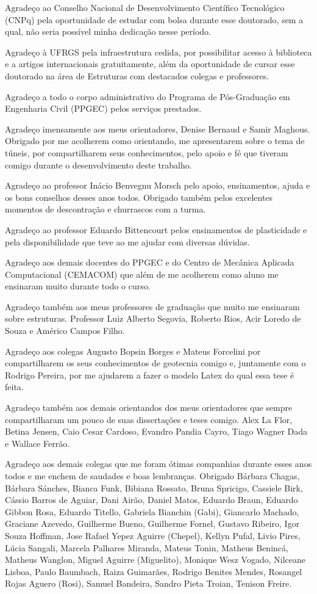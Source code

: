 Agradeço ao Conselho Nacional de Desenvolvimento Científico Tecnológico (CNPq) pela oportunidade de estudar com bolsa durante esse doutorado, sem a qual, não seria possível minha dedicação nesse período.

Agradeço à UFRGS pela infraestrutura cedida, por possibilitar acesso à biblioteca e a artigos internacionais gratuitamente, além da oportunidade de cursar esse doutorado na área de Estruturas com destacados colegas e professores.

Agradeço a todo o corpo administrativo do Programa de Pós-Graduação em Engenharia Civil (PPGEC) pelos serviços prestados.

Agradeço imensamente aos meus orientadores, Denise Bernaud e Samir Maghous. Obrigado por me acolherem como orientando, me apresentarem sobre o tema de túneis, por compartilharem seus conhecimentos, pelo apoio e fé que tiveram comigo durante o desenvolvimento deste trabalho.

Agradeço ao professor Inácio Benvegnu Morsch pelo apoio, ensinamentos, ajuda e os bons conselhos desses anos todos. Obrigado também pelos excelentes momentos de descontração e churrascos com a turma.

Agradeço ao professor Eduardo Bittencourt pelos ensinamentos de plasticidade e pela disponibilidade que teve ao me ajudar com diversas dúvidas.

Agradeço aos demais docentes do PPGEC e do Centro de Mecânica Aplicada Computacional (CEMACOM) que além de me acolherem como aluno me ensinaram muito durante todo o curso.

Agradeço também aos meus professores de graduação que muito me ensinaram sobre estruturas. Professor Luiz Alberto Segovia, Roberto Rios, Acir Loredo de Souza e Américo Campos Filho.

Agradeço aos colegas Augusto Bopsin Borges e Mateus Forcelini por compartilharem os seus conhecimentos de geotecnia comigo e, juntamente com o Rodrigo Pereira, por me ajudarem a fazer o modelo Latex do qual essa tese é feita.

Agradeço também aos demais orientandos dos meus orientadores que sempre compartilharam um pouco de suas dissertações e teses comigo. Alex La Flor,  Betina Jensen, Caio Cesar Cardoso, Evandro Pandia Cayro, Tiago Wagner Dada e Wallace Ferrão. 

Agradeço aos demais colegas que me foram ótimas companhias durante esses anos todos e me enchem de saudades e boas lembranças. Obrigado Bárbara Chagas, Bárbara Sánches, Bianca Funk, Bibiana Rossato, Bruna Spricigo, Cassiele Birk, Cássio Barros de Aguiar, Dani Airão, Daniel Matos, Eduardo Braun, Eduardo Gibbon Rosa, Eduardo Titello, Gabriela Bianchin (Gabi), Giancarlo Machado, Graciane Azevedo, Guilherme Bueno, Guilherme Fornel, Gustavo Ribeiro, Igor Souza Hoffman, Jose Rafael Yepez Aguirre (Chepel), Kellyn Pufal, Livio Pires, Lúcia Sangali, Marcela Palhares Miranda, Mateus Tonin, Matheus Benincá, Matheus Wanglon, Miguel Aguirre (Miguelito), Monique Wesz Vogado, Nilceane Lisboa, Paulo Baumbach, Raiza Guimarães, Rodrigo Benites Mendes, Rosangel Rojas Aguero (Rosi), Samuel Bandeira, Sandro Pieta Troian, Tenison Freire.

